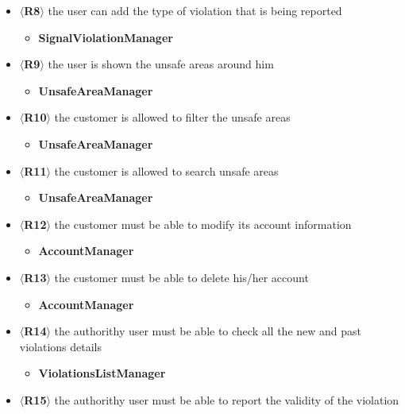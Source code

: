 \begin{itemize}
\begin{itemize}
    \end{itemize}  
    \item $\langle$\textbf{R8}$\rangle$ the user can add the type of violation
    that is being reported
    \begin{itemize}
        \item \textbf{SignalViolationManager}
    \end{itemize}  
    \item $\langle$\textbf{R9}$\rangle$ the user is shown the unsafe areas
    around him
    \begin{itemize}
        \item \textbf{UnsafeAreaManager}
    \end{itemize}  
    \item $\langle$\textbf{R10}$\rangle$ the customer is allowed to filter the
    unsafe areas
    \begin{itemize}
        \item \textbf{UnsafeAreaManager}
    \end{itemize}  
    \item $\langle$\textbf{R11}$\rangle$ the customer is allowed to search
    unsafe areas
    \begin{itemize}
        \item \textbf{UnsafeAreaManager}
    \end{itemize}  
    \item $\langle$\textbf{R12}$\rangle$ the customer must be able to modify its
    account information
    \begin{itemize}
        \item \textbf{AccountManager}
    \end{itemize}  
    \item $\langle$\textbf{R13}$\rangle$ the customer must be able to delete
    his/her account
    \begin{itemize}
        \item  \textbf{AccountManager}
    \end{itemize}  
    \item $\langle$\textbf{R14}$\rangle$ the authorithy user must be able to check
    all the new and past violations details
    \begin{itemize}
        \item \textbf{ViolationsListManager}
    \end{itemize}  
    \item $\langle$\textbf{R15}$\rangle$ the authorithy user must be able to report
    the validity of the violation

\end{itemize}
